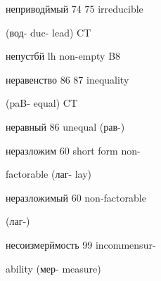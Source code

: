 \begin{minipage}[t]{0.475\textwidth}
\noindent неприводймый 74 75 irreducible\par
\noindent (вод- duc- lead) CT\par
\noindent непустбй lh non-empty B8\par
\noindent неравенство 86 87 inequality\par
\noindent (paB- equal) CT\par
\noindent неравный 86 unequal (рав-)\par
\noindent неразложим 60 short form non-\par
\noindent factorable (лаг- lay)\par
\noindent неразложимый 60 non-factorable\par
\noindent (лаг-)\par
\noindent несоизмерймость 99 incommensur-\par
\noindent ability (мер- measure)\par
\end{minipage}
\endgroup

